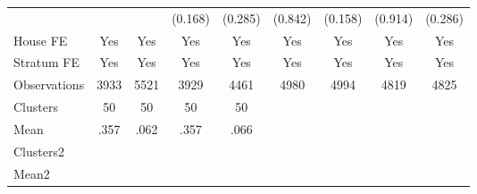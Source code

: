 {\begin{tabular}{l*{8}{c}}
                &                  &                  &  (0.168)         &  (0.285)         &  (0.842)         &  (0.158)         &  (0.914)         &  (0.286)         \\
House FE        &      Yes         &      Yes         &      Yes         &      Yes         &      Yes         &      Yes         &      Yes         &      Yes         \\
Stratum FE      &      Yes         &      Yes         &      Yes         &      Yes         &      Yes         &      Yes         &      Yes         &      Yes         \\
\midrule
Observations    &     3933         &     5521         &     3929         &     4461         &     4980         &     4994         &     4819         &     4825         \\
Clusters        &       50         &       50         &       50         &       50         &                  &                  &                  &                  \\
Mean            &     .357         &     .062         &     .357         &     .066         &                  &                  &                  &                  \\
Clusters2       &                  &                  &                  &                  &                  &                  &                  &                  \\
Mean2           &                  &                  &                  &                  &                  &                  &                  &                  \\
\bottomrule
\end{tabular}
}
